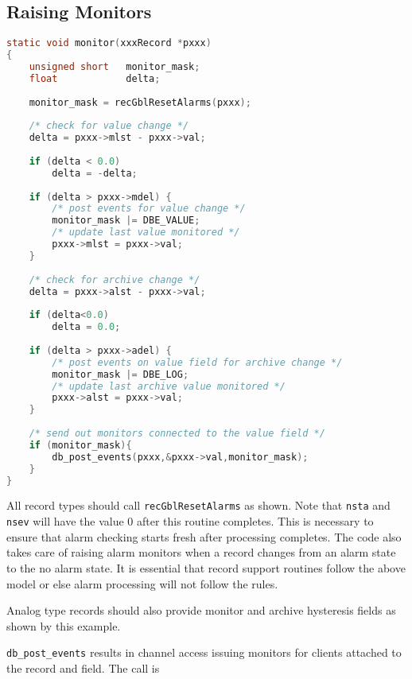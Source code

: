 \subsection{Raising Monitors}

\begin{lstlisting}[language=C]
static void monitor(xxxRecord *pxxx)
{
    unsigned short   monitor_mask;
    float            delta;
    
    monitor_mask = recGblResetAlarms(pxxx);
    
    /* check for value change */
    delta = pxxx->mlst - pxxx->val;
    
    if (delta < 0.0)
        delta = -delta;
    
    if (delta > pxxx->mdel) {
        /* post events for value change */
        monitor_mask |= DBE_VALUE;
        /* update last value monitored */
        pxxx->mlst = pxxx->val;
    }
    
    /* check for archive change */
    delta = pxxx->alst - pxxx->val;
    
    if (delta<0.0)
        delta = 0.0;
    
    if (delta > pxxx->adel) {
        /* post events on value field for archive change */
        monitor_mask |= DBE_LOG;
        /* update last archive value monitored */
        pxxx->alst = pxxx->val;
    }
    
    /* send out monitors connected to the value field */
    if (monitor_mask){
        db_post_events(pxxx,&pxxx->val,monitor_mask);
    }
}
\end{lstlisting}

All record types should call \verb|recGblResetAlarms| as shown.
Note that \verb|nsta| and \verb|nsev| will have the value 0 after this routine completes.
This is necessary to ensure that alarm checking starts fresh after processing completes.
The code also takes care of raising alarm monitors when a record changes from an alarm state to the no alarm state.
It is essential that record support routines follow the above model or else alarm processing will not follow the rules.

Analog type records should also provide monitor and archive hysteresis fields as shown by this example.

\verb|db_post_events| results in channel access issuing monitors for clients attached to the record and field.
The call is

